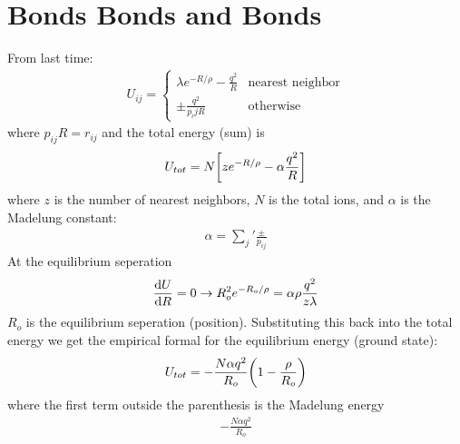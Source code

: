 \documentclass[../main.tex]{subfiles}
\begin{document}
\section*{Bonds Bonds and Bonds}
From last time:
\begin{align*}
    U_{ij} = \begin{cases}
        \lambda e^{-R/\rho} - \frac{q^2}{R} & \text{nearest neighbor} \\
        \pm \frac{q^2}{p_ijR} & \text{otherwise}
    \end{cases}
\end{align*}
where $p_{ij}R = r_{ij}$ and the total energy (sum) is
\begin{align*}
    U_{tot} = N \qt[z e^{-R/\rho} - \alpha \frac{q^2}{R}]
\end{align*}
where $z$ is the number of nearest neighbors, $N$ is the total ions, and $\alpha$ is the Madelung
constant:
\begin{align*}
    \alpha = \sum_j' \frac{\pm}{p_{ij}}
\end{align*}
At the equilibrium seperation
\begin{align*}
    \dv{U}{R} = 0 \rightarrow R_o^2 e^{-R_o/\rho} = \alpha \rho \frac{q^2}{z\lambda}
\end{align*}
$R_o$ is the equilibrium seperation (position). Substituting this back into the total energy we get
the empirical formal for the equilibrium energy (ground state):
\begin{align*}
    U_{tot} = -\frac{N\alpha q^2}{R_o} \qt(1 - \frac{\rho}{R_o})
\end{align*} 
where the first term outside the parenthesis is the Madelung energy
\begin{align*}
    -\frac{N\alpha q^2}{R_o}
\end{align*}
\end{document}

